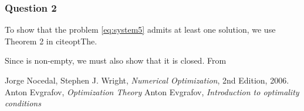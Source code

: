 \documentclass[10pt,a4paper]{article}
\begin{document}
\subsubsection*{Question 2}
To show that the problem \eqref{eq:system5} admits at least one solution, we use Theorem 2 in cite{optThe}.

Since \Omega is non-empty, we must also show that it is closed. From 









\begin{thebibliography}{}

Jorge Nocedal, Stephen J. Wright, \emph{Numerical Optimization}, 2nd Edition, 2006.
Anton Evgrafov, \emph{Optimization Theory} 
Anton Evgrafov, \emph{Introduction to optimality conditions}

\end{thebibliography}
\end{document}
